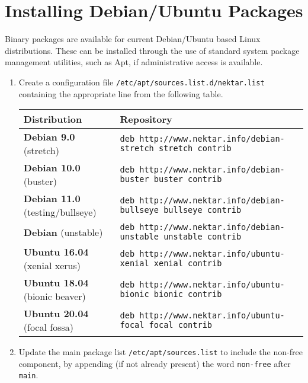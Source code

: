 \section{Installing Debian/Ubuntu Packages}
\label{s:installation:debian}
Binary packages are available for current Debian/Ubuntu based Linux
distributions. These can be installed through the use of standard system package
management utilities, such as Apt, if administrative access is
available.

\begin{enumerate}
	\item Create a configuration file \texttt{/etc/apt/sources.list.d/nektar.list} containing the appropriate line from the following table.
    
	{\small
	\begin{tabular}{p{2.7cm} p{11cm}}
	\toprule
	\textbf{Distribution} & \textbf{Repository} \\
	\midrule
    \textbf{Debian 9.0} \newline (stretch) &
        \texttt{deb http://www.nektar.info/debian-stretch stretch contrib} \\
    \textbf{Debian 10.0} \newline (buster) &
        \texttt{deb http://www.nektar.info/debian-buster buster contrib} \\
    \textbf{Debian 11.0} \newline (testing/bullseye) &
        \texttt{deb http://www.nektar.info/debian-bullseye bullseye contrib} \\
    \textbf{Debian} \newline (unstable) &
        \texttt{deb http://www.nektar.info/debian-unstable unstable contrib} \\
    \midrule
	\textbf{Ubuntu 16.04} \newline (xenial xerus) & 
        \texttt{deb http://www.nektar.info/ubuntu-xenial xenial contrib}\\
	\textbf{Ubuntu 18.04} \newline (bionic beaver) & 
        \texttt{deb http://www.nektar.info/ubuntu-bionic bionic contrib}\\
	\textbf{Ubuntu 20.04} \newline (focal fossa) & 
        \texttt{deb http://www.nektar.info/ubuntu-focal focal contrib}\\
	\bottomrule
	\end{tabular}
	}
    \item Update the main package list \texttt{/etc/apt/sources.list} to include the non-free component, by appending (if not already present) the word \texttt{non-free} after \texttt{main}.

\end{enumerate}
